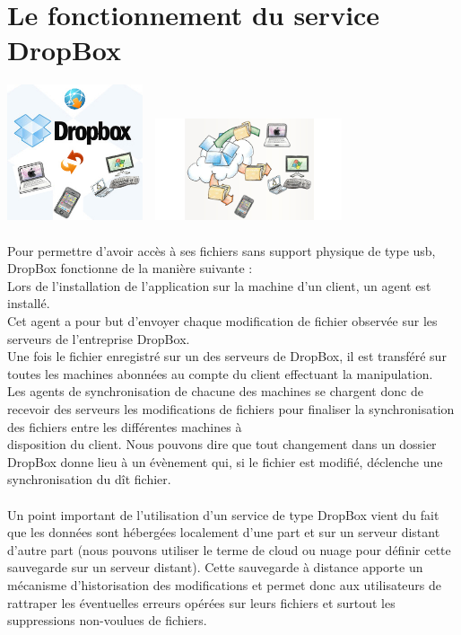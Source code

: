 \documentclass[a4paper, 10pt]{article}
\begin{document}
\section*{Le fonctionnement du service DropBox}
\includegraphics[height = 4cm, width = 4cm]{jpg/dropbox_1.png}
\includegraphics[height = 3cm, width = 6cm]{jpg/dropbox_3.jpg}\\ \\
Pour permettre d'avoir acc\`es \`a ses fichiers sans support physique de type usb, DropBox fonctionne de la mani\`ere suivante :\\
Lors de l'installation de l'application sur la machine d'un client, un agent est install\'e.\\
Cet agent a pour but d'envoyer chaque modification de fichier observ\'ee sur les serveurs de l'entreprise DropBox.\\
Une fois le fichier enregistr\'e sur un des serveurs de DropBox, il est transf\'er\'e sur toutes les machines abonn\'ees
au compte du client effectuant la manipulation.\\
Les agents de synchronisation de chacune des machines se chargent donc de recevoir des serveurs les modifications de fichiers pour
finaliser la synchronisation des fichiers entre les diff\'erentes machines \`a\\disposition du client.
Nous pouvons dire que tout changement dans un dossier DropBox donne lieu \`a un \'ev\`enement qui, si le fichier est modifi\'e,
d\'eclenche une synchronisation du d\^it fichier.\\ \\
Un point important de l'utilisation d'un service de type DropBox vient du fait que les donn\'ees sont h\'eberg\'ees localement d'une part
et sur un serveur distant d'autre part (nous pouvons utiliser le terme de cloud ou nuage pour d\'efinir cette sauvegarde sur un serveur distant).
Cette sauvegarde \`a distance apporte un m\'ecanisme d'historisation des modifications et 
permet donc aux utilisateurs de rattraper les \'eventuelles erreurs op\'er\'ees sur leurs fichiers et
surtout les suppressions non-voulues de fichiers.
\end{document}
